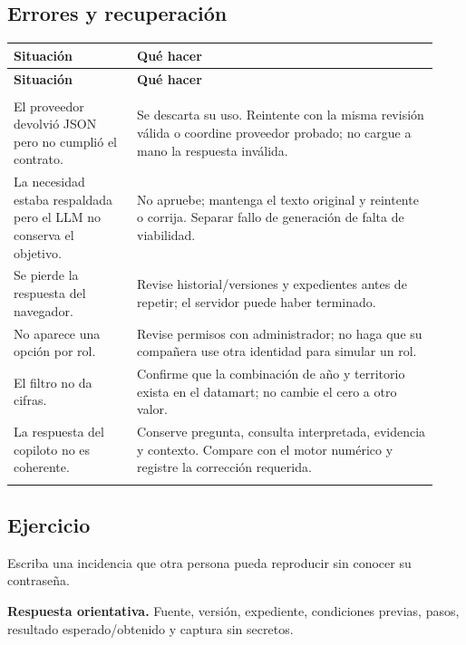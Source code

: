 \subsection{Errores y recuperación}
\begingroup
\fontsize{10}{12.5}\selectfont
\setlength{\tabcolsep}{5pt}
\renewcommand{\arraystretch}{1.15}
\begin{longtable}{@{}>{\RaggedRight\arraybackslash}p{0.27\linewidth}>{\RaggedRight\arraybackslash}p{0.66\linewidth}@{}}
\toprule
\textbf{Situación} & \textbf{Qué hacer} \\
\midrule
\endfirsthead
\toprule
\textbf{Situación} & \textbf{Qué hacer} \\
\midrule
\endhead
\midrule
\multicolumn{2}{r}{\footnotesize Continúa en la página siguiente}\\
\endfoot
\bottomrule
\endlastfoot
El proveedor devolvió JSON pero no cumplió el contrato. & Se descarta su uso. Reintente con la misma revisión válida o coordine proveedor probado; no cargue a mano la respuesta inválida. \\
\addlinespace[3pt]
La necesidad estaba respaldada pero el LLM no conserva el objetivo. & No apruebe; mantenga el texto original y reintente o corrija. Separar fallo de generación de falta de viabilidad. \\
\addlinespace[3pt]
Se pierde la respuesta del navegador. & Revise historial/versiones y expedientes antes de repetir; el servidor puede haber terminado. \\
\addlinespace[3pt]
No aparece una opción por rol. & Revise permisos con administrador; no haga que su compañera use otra identidad para simular un rol. \\
\addlinespace[3pt]
El filtro no da cifras. & Confirme que la combinación de año y territorio exista en el datamart; no cambie el cero a otro valor. \\
\addlinespace[3pt]
La respuesta del copiloto no es coherente. & Conserve pregunta, consulta interpretada, evidencia y contexto. Compare con el motor numérico y registre la corrección requerida. \\
\addlinespace[3pt]
\end{longtable}
\endgroup

\subsection{Ejercicio}
Escriba una incidencia que otra persona pueda reproducir sin conocer su contraseña.

\textbf{Respuesta orientativa.} Fuente, versión, expediente, condiciones previas, pasos, resultado esperado/obtenido y captura sin secretos.

